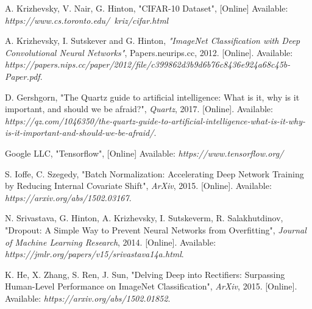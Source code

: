 \documentclass[journal]{IEEEtran}
\begin{document}
\begin{thebibliography}{1}


\bibitem{}
A. Krizhevsky, V. Nair, G. Hinton, "CIFAR-10 Dataset", [Online] Available:
\emph{https://www.cs.toronto.edu/~kriz/cifar.html}

A. Krizhevsky, I. Sutskever and G. Hinton, \emph{"ImageNet Classification with Deep Convolutional Neural Networks"}, Papers.neurips.cc, 2012. [Online]. Available: \emph{https://papers.nips.cc/paper/2012/file/c399862d3b9d6b76c8436e924a68c45b-Paper.pdf}. %

D. Gershgorn, "The Quartz guide to artificial intelligence: What is it, why is it important, and should we be afraid?", \emph{Quartz}, 2017. [Online]. Available: \emph{https://qz.com/1046350/the-quartz-guide-to-artificial-intelligence-what-is-it-why-is-it-important-and-should-we-be-afraid/}. %

\bibitem{}
Google LLC, "Tensorflow", [Online] Available:
\emph{https://www.tensorflow.org/}

S. Ioffe, C. Szegedy, "Batch Normalization: Accelerating Deep Network Training by Reducing Internal Covariate Shift", \emph{ArXiv}, 2015. [Online]. Available: \emph{https://arxiv.org/abs/1502.03167}.

N. Srivastava, G. Hinton, A. Krizhevsky, I. Sutskeverm, R. Salakhutdinov, "Dropout: A Simple Way to Prevent Neural Networks from Overfitting", \emph{Journal of Machine Learning Research}, 2014. [Online]. Available: \emph{https://jmlr.org/papers/v15/srivastava14a.html}.

K. He, X. Zhang, S. Ren, J. Sun, "Delving Deep into Rectifiers: Surpassing Human-Level Performance on ImageNet Classification", \emph{ArXiv}, 2015. [Online]. Available: \emph{https://arxiv.org/abs/1502.01852}.

\end{thebibliography}
\end{document}
